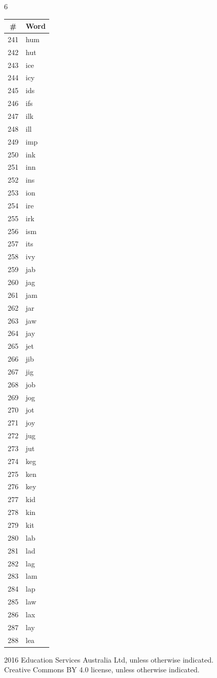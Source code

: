 \documentclass[11pt,a4paper]{article}
\begin{document}
\begin{multicols}{6}
\columnbreak

\begin{tabular}{cl}
\toprule
\# & Word \\
\midrule
241 & hum \\
242 & hut \\
243 & ice \\
244 & icy \\
245 & ids \\
246 & ifs \\
247 & ilk \\
248 & ill \\
249 & imp \\
250 & ink \\
251 & inn \\
252 & ins \\
253 & ion \\
254 & ire \\
255 & irk \\
256 & ism \\
257 & its \\
258 & ivy \\
259 & jab \\
260 & jag \\
261 & jam \\
262 & jar \\
263 & jaw \\
264 & jay \\
265 & jet \\
266 & jib \\
267 & jig \\
268 & job \\
269 & jog \\
270 & jot \\
271 & joy \\
272 & jug \\
273 & jut \\
274 & keg \\
275 & ken \\
276 & key \\
277 & kid \\
278 & kin \\
279 & kit \\
280 & lab \\
281 & lad \\
282 & lag \\
283 & lam \\
284 & lap \\
285 & law \\
286 & lax \\
287 & lay \\
288 & lea \\
\bottomrule
\end{tabular}
\end{multicols}

\vfill

\noindent\small
\textcopyright{} 2016 Education Services Australia Ltd, unless otherwise indicated.\\
Creative Commons BY 4.0 license, unless otherwise indicated.
\end{document}
